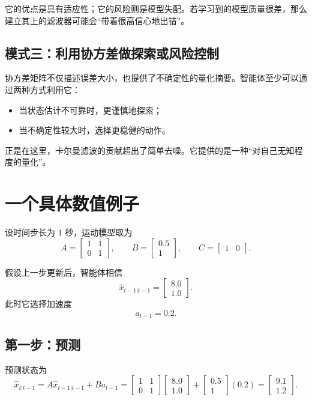 \documentclass[12pt,a4paper]{ctexart}
\begin{document}
它的优点是具有适应性；它的风险则是模型失配。若学习到的模型质量很差，那么建立其上的滤波器可能会“带着很高信心地出错”。

\subsection{模式三：利用协方差做探索或风险控制}

协方差矩阵不仅描述误差大小，也提供了不确定性的量化摘要。智能体至少可以通过两种方式利用它：
\begin{itemize}
  \item 当状态估计不可靠时，更谨慎地探索；
  \item 当不确定性较大时，选择更稳健的动作。
\end{itemize}

正是在这里，卡尔曼滤波的贡献超出了简单去噪。它提供的是一种“对自己无知程度的量化”。

\section{一个具体数值例子}

设时间步长为 \(1\) 秒，运动模型取为
\[
A =
\begin{bmatrix}
1 & 1\\
0 & 1
\end{bmatrix},
\qquad
B =
\begin{bmatrix}
0.5\\
1
\end{bmatrix},
\qquad
C =
\begin{bmatrix}
1 & 0
\end{bmatrix}.
\]

假设上一步更新后，智能体相信
\[
\hat{x}_{t-1|t-1} =
\begin{bmatrix}
8.0\\
1.0
\end{bmatrix}.
\]
此时它选择加速度
\[
a_{t-1} = 0.2.
\]

\subsection{第一步：预测}

预测状态为
\[
\hat{x}_{t|t-1}
=
A\hat{x}_{t-1|t-1} + Ba_{t-1}
=
\begin{bmatrix}
1 & 1\\
0 & 1
\end{bmatrix}
\begin{bmatrix}
8.0\\
1.0
\end{bmatrix}
+
\begin{bmatrix}
0.5\\
1
\end{bmatrix}
(0.2)
=
\begin{bmatrix}
9.1\\
1.2
\end{bmatrix}.
\]
\end{document}
